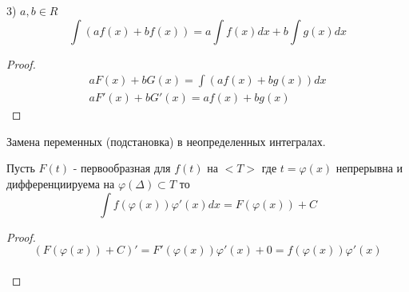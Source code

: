 3) $a, b \in R$\\
\[\int (af(x) + bf(x)) = a \int f(x)dx + b \int g(x)dx\]
\begin{proof}
  \begin{eqnarray*}
    aF(x) + bG(x) = \int (af(x) + bg(x))dx\\
    aF'(x) + bG'(x) = af(x) + bg(x)
  \end{eqnarray*}
\end{proof}

\begin{title}[\Large]
  Замена переменных (подстановка) в неопределенных интегралах.
\end{title}

\begin{theorem}
  Пусть $F(t)$ - первообразная для $f(t)$ на $<T>$ где $t = \varphi (x)$
  непрерывна и дифференциируема на $\varphi(\Delta) \subset T$ то\\
  \[\int f(\varphi (x)) \varphi'(x)dx = F(\varphi (x)) + C\]
\end{theorem}

\begin{proof}
  \[(F(\varphi(x)) + C)' = F'(\varphi (x)) \varphi'(x) + 0 = f(\varphi(x))
    \varphi'(x)\]\\
\end{proof}